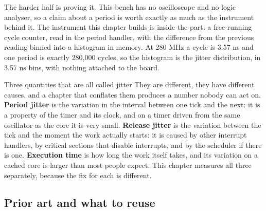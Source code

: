 The harder half is proving it. This bench has no oscilloscope and no logic
analyser, so a claim about a period is worth exactly as much as the instrument
behind it. The instrument this chapter builds is inside the part: a free-running
cycle counter, read in the period handler, with the difference from the previous
reading binned into a histogram in memory. At 280 MHz a cycle is 3.57 ns and one
period is exactly 280,000 cycles, so the histogram is the jitter distribution,
in 3.57 ns bins, with nothing attached to the board.

\begin{note}{Three quantities that are all called jitter}
They are different, they have different causes, and a chapter that conflates
them produces a number nobody can act on. \textbf{Period jitter} is the
variation in the interval between one tick and the next: it is a property of the
timer and its clock, and on a timer driven from the same oscillator as the core
it is very small. \textbf{Release jitter} is the variation between the tick and
the moment the work actually starts: it is caused by other interrupt handlers,
by critical sections that disable interrupts, and by the scheduler if there is
one. \textbf{Execution time} is how long the work itself takes, and its
variation on a cached core is larger than most people expect. This chapter
measures all three separately, because the fix for each is different.
\end{note}

\subsection*{Prior art and what to reuse}

